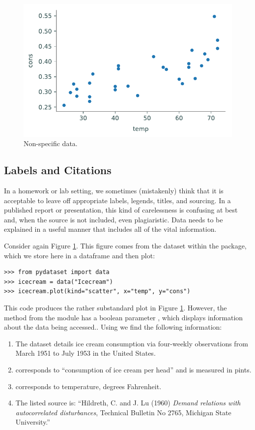 \begin{figure}[H]
    \centering
    \includegraphics[width=.7\textwidth]{figures/ice_cream_bad.pdf}
    \caption{Non-specific data.}
    \label{fig:nolabels}
\end{figure}

\subsection*{Labels and Citations} %

In a homework or lab setting, we sometimes (mistakenly) think that it is acceptable to leave off appropriate labels, legends, titles, and sourcing.
In a published report or presentation, this kind of carelessness is confusing at best and, when the source is not included, even plagiaristic.
Data needs to be explained in a useful manner that includes all of the vital information.

Consider again Figure \ref{fig:nolabels}.
This figure comes from the  dataset within the  package, which we store here in a dataframe and then plot:
\begin{lstlisting}
>>> from pydataset import data
>>> icecream = data("Icecream")
>>> icecream.plot(kind="scatter", x="temp", y="cons")
\end{lstlisting}

This code produces the rather substandard plot in Figure \ref{fig:nolabels}.
However, the method  from the  module has a boolean parameter , which displays information about the data being accessed..
Using  we find the following information:
\begin{enumerate}
    \item The dataset details ice cream consumption via four-weekly observations from March 1951 to July 1953 in the United States.
    \item {} corresponds to ``consumption of ice cream per head'' and is measured in pints.
    \item {} corresponds to temperature, degrees Fahrenheit.
    \item The listed source is: ``Hildreth, C. and J. Lu (1960) \emph{Demand relations with autocorrelated disturbances}, Technical Bulletin No 2765, Michigan State University.''
\end{enumerate}

